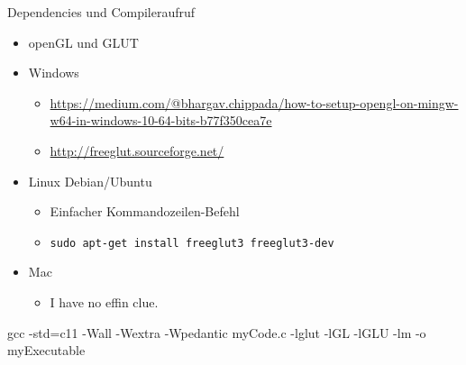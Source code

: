 \begin{frame}{Dependencies und Compileraufruf}
%
\begin{itemize}
\item openGL und GLUT
\item Windows
	\begin{itemize}
	\item \url{https://medium.com/@bhargav.chippada/how-to-setup-opengl-on-mingw-w64-in-windows-10-64-bits-b77f350cea7e}
	\item \url{http://freeglut.sourceforge.net/}
	\end{itemize}
\item Linux Debian/Ubuntu
	\begin{itemize}
	\item Einfacher Kommandozeilen-Befehl
	\item \texttt{sudo apt-get install freeglut3 freeglut3-dev}
	\end{itemize}
\item Mac
	\begin{itemize}
	\item I have no effin clue.
	\end{itemize}
\end{itemize}
%
\begin{cmdbox}
\scriptsize
gcc -std=c11 -Wall -Wextra -Wpedantic myCode.c {\color{cyan} -lglut -lGL -lGLU -lm} -o myExecutable
\end{cmdbox}
%
\end{frame}


